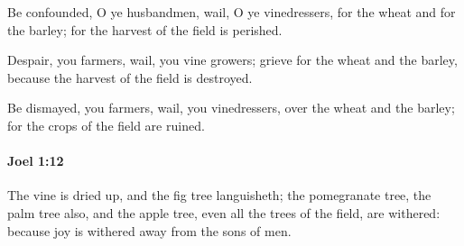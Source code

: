 			\begin{versebox}
					\item[BHS] 
					\item[LXX] 
					\item[ASV] Be confounded, O ye husbandmen, wail, O ye vinedressers, for the wheat and for the barley; for the harvest of the field is perished.
					\item[NIV] Despair, you farmers, wail, you vine growers; grieve for the wheat and the barley, because the harvest of the field is destroyed.
					\item[NRSV] Be dismayed, you farmers, wail, you vinedressers, over the wheat and the barley; for the crops of the field are ruined.
			\end{versebox}

		\paragraph{Joel 1:12} %
			\label{JOEL-1-12}

			The vine is dried up, and the fig tree languisheth; the pomegranate tree, the palm tree also, and the apple tree, even all the trees of the field, are withered: because joy is withered away from the sons of men.

